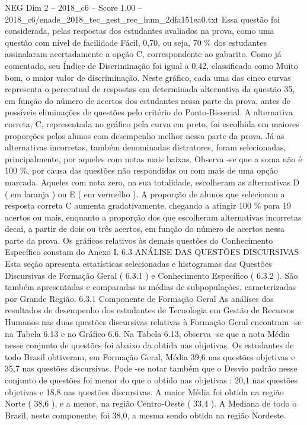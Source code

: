\begin{textsample}{NEG Dim 2 – 2018\_c6 – Score 1.00 – 2018\_c6/enade\_2018\_tec\_gest\_rec\_hum\_2dfa151ea0.txt}
Essa questão foi considerada, pelas respostas dos estudantes avaliados na prova, como uma questão com nível de facilidade Fácil, 0,70, ou seja, 70 \% dos estudantes assinalaram acertadamente a opção C, correspondente ao gabarito.
Como já comentado, seu Índice de Discriminação foi igual a 0,42, classificado como Muito bom, o maior valor de discriminação.
Neste gráfico, cada uma das cinco curvas representa o percentual de respostas em determinada alternativa da questão 35, em função do número de acertos dos estudantes nessa parte da prova, antes de possíveis eliminações de questões pelo critério do Ponto-Bisserial.
A alternativa correta, C, representada no gráfico pela curva em preto, foi escolhida em maiores proporções pelos alunos com desempenho melhor nessa parte da prova.
Já as alternativas incorretas, também denominadas distratores, foram selecionadas, principalmente, por aqueles com notas mais baixas.
Observa -se que a soma não é 100 \%, por causa das questões não respondidas ou com mais de uma opção marcada.
Aqueles com nota zero, na sua totalidade, escolheram as alternativas D ( em laranja ) ou E ( em vermelho ).
A proporção de alunos que selecionou a resposta correta C aumenta gradativamente, chegando a atingir 100 \% para 19 acertos ou mais, enquanto a proporção dos que escolheram alternativas incorretas decai, a partir de dois ou três acertos, em função do número de acertos nessa parte da prova.
Os gráficos relativos às demais questões do Conhecimento Específico constam do Anexo I. 6.3 ANÁLISE DAS QUESTÕES DISCURSIVAS Esta seção apresenta estatísticas selecionadas e histogramas das Questões Discursivas de Formação Geral ( 6.3.1 ) e Conhecimento Específico ( 6.3.2 ).
São também apresentadas e comparadas as médias de subpopulações, caracterizadas por Grande Região. 6.3.1 Componente de Formação Geral As análises dos resultados de desempenho dos estudantes de Tecnologia em Gestão de Recursos Humanos nas duas questões discursivas relativas à Formação Geral encontram -se na Tabela 6.13 e no Gráfico 6.6.
Na Tabela 6.13, observa -se que a nota Média nesse conjunto de questões foi abaixo da obtida nas objetivas.
Os estudantes de todo Brasil obtiveram, em Formação Geral, Média 39,6 nas questões objetivas e 35,7 nas questões discursivas.
Pode -se notar também que o Desvio padrão nesse conjunto de questões foi menor do que o obtido nas objetivas : 20,1 nas questões objetivas e 18,8 nas questões discursivas.
A maior Média foi obtida na região Norte ( 38,6 ), e a menor, na região Centro-Oeste ( 33,4 ).
A Mediana de todo o Brasil, neste componente, foi 38,0, a mesma sendo obtida na região Nordeste.

\end{textsample}
